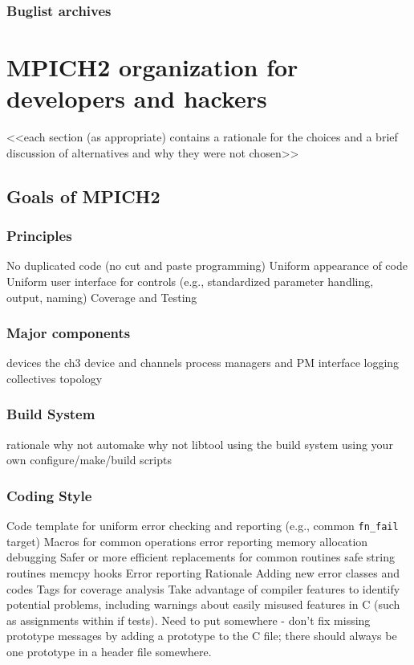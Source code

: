 \documentclass{report}
\begin{document}
\section{Buglist archives}


\part{MPICH2 organization for developers and hackers}


    <<each section (as appropriate) contains a rationale for the choices and a brief discussion of alternatives and why they were not chosen>>

\chapter{Goals of MPICH2}


\section{Principles}
         No duplicated code (no cut and paste programming) 
         Uniform appearance of code
         Uniform user interface for controls (e.g., standardized parameter handling, output, naming)
         Coverage and Testing

\section{Major components}
         devices
              the ch3 device and channels
         process managers and PM interface
         logging
         collectives
         topology

\section{Build System}
         rationale
              why not automake
              why not libtool
         using the build system
         using your own configure/make/build scripts

\section{Coding Style}
         Code template for uniform error checking and reporting (e.g.,
         common \texttt{fn\_fail} target) 
         Macros for common operations
              error reporting
              memory allocation
              debugging
         Safer or more efficient replacements for common routines
              safe string routines
              memcpy hooks
         Error reporting
              Rationale
               Adding new error classes and codes
         Tags for coverage analysis
         Take advantage of compiler features to identify potential
         problems, including warnings about easily misused features in
         C (such as assignments within if tests).  
	 Need to put somewhere - don't fix missing prototype messages
         by adding a prototype to the C file; there should always be
         one prototype in a header file somewhere.
\end{document}
